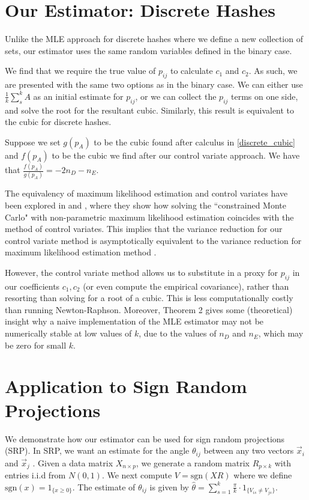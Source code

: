 \documentclass[runningheads]{llncs}
\begin{document}
\section{Our Estimator: Discrete Hashes}

Unlike the MLE approach for discrete hashes where we define a new collection of sets, our estimator uses the same random variables defined in the binary case.
        
We find that we require the true value of $p_{ij}$ to calculate $c_1$ and $c_2$. As such, we are presented with the same two options as in the binary case. We can either use $\frac{1}{k}\sum_s^k A$ as an initial estimate for $p_{ij}$, or we can collect the $p_{ij}$ terms on one side, and solve the root for the resultant cubic. Similarly, this result is equivalent to the cubic for discrete hashes.

\begin{theorem}
Suppose we set $g(p_A)$ to be the cubic found after calculus in \eqref{discrete_cubic} and $f(p_A)$ to be the cubic we find after our control variate approach. We have that $\frac{f(p_A)}{g(p_A)} = -2n_D - n_E$.
\end{theorem}

The equivalency of maximum likelihood estimation and control variates have been explored in \cite{glynn2002some} and \cite{szechtman2001constrained}, where they show how solving the ``constrained Monte Carlo" with non-parametric maximum likelihood estimation coincides with the method of control variates. This implies that the variance reduction for our control variate method is asymptotically equivalent to the variance reduction for maximum likelihood estimation method \cite{kang2018improving}.

However, the control variate method allows us to substitute in a proxy for $p_{ij}$ in our coefficients $c_1, c_2$ (or even compute the empirical covariance), rather than resorting than solving for a root of a cubic. This is less computationally costly than running Newton-Raphson. Moreover, Theorem 2 gives some (theoretical) insight why a naive implementation of the MLE estimator may not be numerically stable at low values of $k$, due to the values of $n_D$ and $n_E$, which may be zero for small $k$. 
 
\section{Application to Sign Random Projections}

We demonstrate how our estimator can be used for sign random projections (SRP). In SRP, we want an estimate for the angle $\theta_{ij}$ between any two vectors $\vec{x}_i$ and $\vec{x}_j$ \cite{goemans1995improved}. Given a data matrix $X_{n\times p}$, we generate a random matrix $R_{p\times k}$ with entries i.i.d from $N(0, 1)$. We next compute $V = \text{sgn}(XR)$ where we define $\text{sgn}(x) = 1_{\{x \geq 0\}}$. The estimate of $\theta_{ij}$ is given by $\hat{\theta} = \sum_{s=1}^k \frac{\pi}{k} \cdot 1_{\{V_{is} \neq V_{js}\}}$.
        
\end{document}
